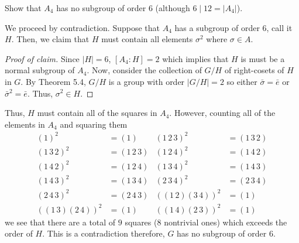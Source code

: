 \begin{problem}
  Show that $A_4$ has no subgroup of order $6$ (although $6\mid 12=|A_4|$).
\end{problem}
\begin{solution}
  We proceed by contradiction. Suppose that $A_4$ has a subgroup of order
  $6$, call it $H$. Then, we claim that $H$ must contain all elements
  $\sigma^2$ where $\sigma\in A$.
  \begin{proof}[Proof of claim]
    Since $|H|=6$, $[A_4:H]=2$ which implies that $H$ is must be a normal
    subgroup of $A_4$. Now, consider the collection of $G/H$ of
    right-cosets of $H$ in $G$. By Theorem 5.4, $G/H$ is a group with order
    $|G/H|=2$ so either $\bar\sigma=\bar e$ or ${\bar\sigma}^2=\bar
    e$. Thus, $\sigma^2\in H$.
  \end{proof}
  Thus, $H$ must contain all of the squares in $A_4$. However, counting all
  of the elements in $A_4$ and squaring them
  \begin{align*}
    (1)^2&=(1)
    &(1\,2\,3)^2&=(1\,3\,2)
    \\
    (1\,3\,2)^2&=(1\,2\,3)
    &(1\,2\,4)^2&=(1\,4\,2)\\
    (1\,4\,2)^2&=(1\,2\,4)
    &(1\,3\,4)^2&=(1\,4\,3)\\
    (1\,4\,3)^2&=(1\,3\,4)
    &(2\,3\,4)^2&=(2\,3\,4)\\
    (2\,4\,3)^2&=(2\,4\,3)
    &((1\,2)(3\,4))^2
             &=(1)\\
    ((1\,3)(2\,4))^2&=(1)&
    ((1\,4)(2\,3))^2&=(1)
  \end{align*}
  we see that there are a total of $9$ squares ($8$ nontrivial ones) which
  exceeds the order of $H$. This is a contradiction therefore, $G$ has no
  subgroup of order $6$.
\end{solution}

